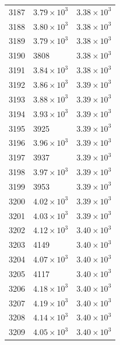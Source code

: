 \begin{table}[H]
\begin{tabular}{lll}
3187 & $\displaystyle 3.79 \times 10^{3}$ & $\displaystyle 3.38 \times 10^{3}$ \\
3188 & $\displaystyle 3.80 \times 10^{3}$ & $\displaystyle 3.38 \times 10^{3}$ \\
3189 & $\displaystyle 3.79 \times 10^{3}$ & $\displaystyle 3.38 \times 10^{3}$ \\
3190 & 3808 & $\displaystyle 3.38 \times 10^{3}$ \\
3191 & $\displaystyle 3.84 \times 10^{3}$ & $\displaystyle 3.38 \times 10^{3}$ \\
3192 & $\displaystyle 3.86 \times 10^{3}$ & $\displaystyle 3.39 \times 10^{3}$ \\
3193 & $\displaystyle 3.88 \times 10^{3}$ & $\displaystyle 3.39 \times 10^{3}$ \\
3194 & $\displaystyle 3.93 \times 10^{3}$ & $\displaystyle 3.39 \times 10^{3}$ \\
3195 & 3925 & $\displaystyle 3.39 \times 10^{3}$ \\
3196 & $\displaystyle 3.96 \times 10^{3}$ & $\displaystyle 3.39 \times 10^{3}$ \\
3197 & 3937 & $\displaystyle 3.39 \times 10^{3}$ \\
3198 & $\displaystyle 3.97 \times 10^{3}$ & $\displaystyle 3.39 \times 10^{3}$ \\
3199 & 3953 & $\displaystyle 3.39 \times 10^{3}$ \\
3200 & $\displaystyle 4.02 \times 10^{3}$ & $\displaystyle 3.39 \times 10^{3}$ \\
3201 & $\displaystyle 4.03 \times 10^{3}$ & $\displaystyle 3.39 \times 10^{3}$ \\
3202 & $\displaystyle 4.12 \times 10^{3}$ & $\displaystyle 3.40 \times 10^{3}$ \\
3203 & 4149 & $\displaystyle 3.40 \times 10^{3}$ \\
3204 & $\displaystyle 4.07 \times 10^{3}$ & $\displaystyle 3.40 \times 10^{3}$ \\
3205 & 4117 & $\displaystyle 3.40 \times 10^{3}$ \\
3206 & $\displaystyle 4.18 \times 10^{3}$ & $\displaystyle 3.40 \times 10^{3}$ \\
3207 & $\displaystyle 4.19 \times 10^{3}$ & $\displaystyle 3.40 \times 10^{3}$ \\
3208 & $\displaystyle 4.14 \times 10^{3}$ & $\displaystyle 3.40 \times 10^{3}$ \\
3209 & $\displaystyle 4.05 \times 10^{3}$ & $\displaystyle 3.40 \times 10^{3}$ \\

\end{tabular}
\end{table}
